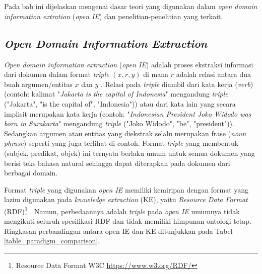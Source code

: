 \chapter{\babDua}
\label{chap:babDua}
Pada bab ini dijelaskan mengenai dasar teori yang digunakan dalam \textit{open domain information extration} (\textit{open IE}) dan penelitian-penelitian yang terkait.

\section{\textit{Open Domain Information Extraction}}

\textit{Open domain information extraction} (\textit{open IE}) adalah proses ekstraksi informasi dari dokumen dalam format \textit{triple} $(x, r, y)$ di mana $r$ adalah relasi antara dua buah argumen/entitas $x$ dan $y$ \citep{banko2007open, etzioni2011open}. Relasi pada \textit{triple} diambil dari kata kerja (\textit{verb}) \citep{banko2007open, fader2011identifying} (contoh: kalimat "\textit{Jakarta is the capital of Indonesia}" mengandung \textit{triple} ("Jakarta", "is the capital of", "Indonesia")) atau dari kata lain yang secara implisit merupakan kata kerja \citep{schmitz2012open} (contoh: "\textit{Indonesian President Joko Widodo was born in Surakarta}" mengandung \textit{triple} ("Joko Widodo", "be", "president")). Sedangkan argumen atau entitas yang diekstrak selalu merupakan frase (\textit{noun phrase}) seperti yang juga terlihat di contoh. Format \textit{triple} yang membentuk (subjek, predikat, objek) ini ternyata berlaku umum untuk semua dokumen yang berisi teks bahasa natural sehingga dapat diterapkan pada dokumen dari berbagai domain. 

Format \textit{triple} yang digunakan \textit{open IE} memiliki kemiripan dengan format yang lazim digunakan pada \textit{knowledge extraction} (KE), yaitu \textit{Resource Data Format} (RDF)\footnote{Resource Data Format W3C \url{https://www.w3.org/RDF/}} \citep{auer2007dbpedia, exner2014refractive}. Namun, perbedaannya adalah \textit{triple} pada \textit{open IE} umumnya tidak mengikuti seluruh spesifikasi RDF dan tidak memiliki himpunan ontologi tetap. Ringkasan perbandingan antara open IE dan KE ditunjukkan pada Tabel \ref{table_paradigm_comparison}. 

